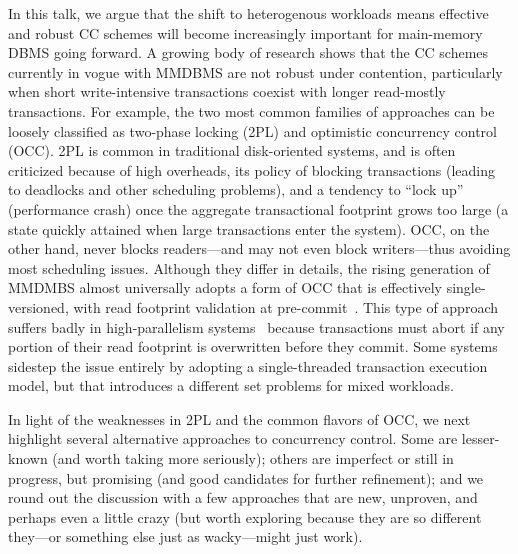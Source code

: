 \documentclass[preprint]{sig-alternate-nocprt}
\begin{document}
In this talk, we argue that the shift to heterogenous workloads means effective and robust CC schemes will become increasingly important for main-memory DBMS going forward. A growing body of research shows that the CC schemes currently in vogue with MMDBMS are not robust under contention, particularly when short write-intensive transactions coexist with longer read-mostly transactions. For example, the two most common families of approaches can be loosely classified as two-phase locking (2PL) and optimistic concurrency control (OCC). 2PL is common in traditional disk-oriented systems, and is often criticized because of high overheads, its policy of blocking transactions (leading to deadlocks and other scheduling problems), and a tendency to ``lock up'' (performance crash) once the aggregate transactional footprint grows too large (a state quickly attained when large transactions enter the system). OCC, on the other hand, never blocks readers---and may not even block writers---thus avoiding most scheduling issues. Although they differ in details, the rising generation of MMDMBS almost universally adopts a form of OCC that is effectively single-versioned, with read footprint validation at pre-commit~\cite{Hekaton,Silo}. This type of approach suffers badly in high-parallelism systems~\cite{CCAbyss} because transactions must abort if any portion of their read footprint is overwritten before they commit. Some systems~\cite{HStore,Hyper} sidestep the issue entirely by adopting a single-threaded transaction execution model, but that introduces a different set problems for mixed workloads.

In light of the weaknesses in 2PL and the common flavors of OCC, we next highlight several alternative approaches to concurrency control. Some are lesser-known (and worth taking more seriously); others are imperfect or still in progress, but promising (and good candidates for further refinement); and we round out the discussion with a few approaches that are new, unproven, and perhaps even a little crazy (but worth exploring because they are so different they---or something else just as wacky---might just work).
\end{document}
